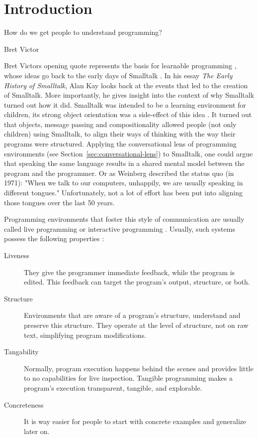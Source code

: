 \chapter{Introduction}
\label{cha:introduction}
\epigraph{How do we get people to understand programming?}{Bret Victor}

Bret Victors opening quote represents the basis for learnable programming \cite{victor_learnable_2012}, whose ideas go back to the early days of Smalltalk \cite{kay_early_1993}.
In his essay \emph{The Early History of Smalltalk}, Alan Kay looks back at the events that led to the creation of Smalltalk.
More importantly, he gives insight into the context of why Smalltalk turned out how it did.
Smalltalk was intended to be a learning environment for children, its strong object orientation was a side-effect of this idea \cite{kay_early_1993}.
It turned out that objects, message passing and compositionality allowed people (not only children) using Smalltalk, to align their ways of thinking with the way their programs were structured.
Applying the conversational lens of programming environments (see Section~\ref{sec:conversational-lens}) to Smalltalk, one could argue that speaking the same language results in a shared mental model between the program and the programmer.
Or as Weinberg \cite{weinberg_psychology_1971} described the status quo (in 1971): "When we talk to our computers, unhappily, we are usually speaking in different tongues."
Unfortunately, not a lot of effort has been put into aligning those tongues over the last 50 years.

Programming environments that foster this style of communication are usually called live programming\cite{aguiar_live_2019, church_liveness_2010} or interactive programming \cite{czaplicki_interactive_2013, mccabe_towards_2023}.
Usually, such systems possess the following properties \cite{burg_1st_2013}:
\begin{description}
    \item[Liveness] They give the programmer immediate feedback, while the program is edited. This feedback can target the program's output, structure, or both.
    \item[Structure] Environments that are aware of a program's structure, understand and preserve this structure. They operate at the level of structure, not on raw text, simplifying program modifications.
    \item[Tangability] Normally, program execution happens behind the scenes and provides little to no capabilities for live inspection. Tangible programming makes a program's execution transparent, tangible, and explorable.
    \item[Concreteness] It is way easier for people to start with concrete examples and generalize later on.
\end{description}

